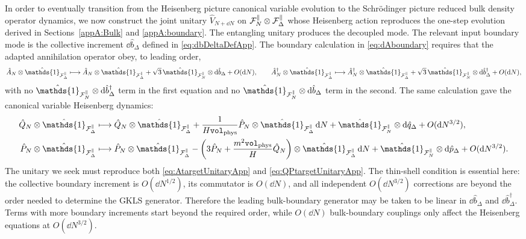 \documentclass{article}
\def\cF{{\cal F}}
\newcommand{\openone}{\hat{\mathds{1}}}
\newcommand{\Vphys}{\mathtt{vol}_{\rm phys}}
\numberwithin{equation}{section}
\begin{document}
	In order to eventually transition from the Heisenberg picture canonical variable evolution to the Schr\"odinger picture reduced bulk density operator dynamics, we now construct the joint unitary \(\hat V_{N+\dd N}\) on \(\cF_N^\parallel\otimes\cF_\Delta^\parallel\) whose Heisenberg action reproduces the one-step evolution derived in Sections~\ref{appA:Bulk} and \ref{appA:boundary}. The entangling unitary produces the decoupled mode. The relevant input boundary mode is the collective increment \(\dd\hat b_\Delta\) defined in \cref{eq:dbDeltaDefApp}. The boundary calculation in \cref{eq:dAboundary} requires that the adapted annihilation operator obey, to leading order,
	\begin{equation}
		\hat A_N\otimes\openone_{\cF_\Delta^\parallel} \longmapsto \hat A_N\otimes\openone_{\cF_\Delta^\parallel} + \sqrt3\,\openone_{\cF_N^\parallel}\otimes \dd\hat b_\Delta + O(\dd N), \qquad \hat A_N^\dagger\otimes\openone_{\cF_\Delta^\parallel} \longmapsto \hat A_N^\dagger\otimes\openone_{\cF_\Delta^\parallel} + \sqrt3\,\openone_{\cF_N^\parallel}\otimes \dd\hat b_\Delta^\dagger + O(\dd N),
		\label{eq:AtargetUnitaryApp}
	\end{equation}
	with no \(\openone_{\cF_N^\parallel}\otimes \dd\hat b_\Delta^\dagger\) term in the first equation and no \(\openone_{\cF_N^\parallel}\otimes \dd\hat b_\Delta\) term in the second. The same calculation gave the canonical variable Heisenberg dynamics:
	\begin{align}
		\hat Q_N\otimes\openone_{\cF_\Delta^\parallel} &\longmapsto \hat Q_N\otimes\openone_{\cF_\Delta^\parallel} + \frac{1}{H\Vphys}\hat P_N\otimes\openone_{\cF_\Delta^\parallel}\,\dd N + \openone_{\cF_N^\parallel}\otimes \dd\hat q_\Delta + O(\dd N^{3/2}), \nonumber\\ \hat P_N\otimes\openone_{\cF_\Delta^\parallel} &\longmapsto \hat P_N\otimes\openone_{\cF_\Delta^\parallel} - \left( 3\hat P_N + \frac{m^2\Vphys}{H}\hat Q_N \right)\otimes\openone_{\cF_\Delta^\parallel}\,\dd N + \openone_{\cF_N^\parallel}\otimes \dd\hat p_\Delta + O(\dd N^{3/2}).
		\label{eq:QPtargetUnitaryApp}
	\end{align}
	The unitary we seek must reproduce both \cref{eq:AtargetUnitaryApp} and \cref{eq:QPtargetUnitaryApp}. The thin-shell condition is essential here: the collective boundary increment is \(O(\dd N^{1/2})\), its commutator is \(O(\dd N)\), and all independent \(O(\dd N^{3/2})\) corrections are beyond the order needed to determine the GKLS generator. Therefore the leading bulk-boundary generator may be taken to be linear in \(\dd\hat b_\Delta\) and \(\dd\hat b_\Delta^\dagger\). Terms with more boundary increments start beyond the required order, while \(O(\dd N)\) bulk-boundary couplings only affect the Heisenberg equations at \(O(\dd N^{3/2})\).
\end{document}
